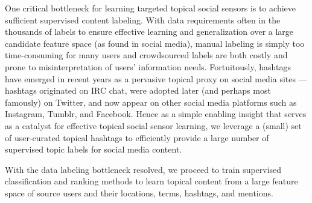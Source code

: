 

One critical bottleneck for learning targeted topical social sensors
is to achieve sufficient supervised content labeling.  With data
requirements often in the thousands of labels to ensure effective
learning and generalization over a large candidate feature space (as
found in social media), manual labeling is simply too time-consuming
for many users and crowdsourced labels are both costly and prone to
misinterpretation of users' information needs.  Fortuitously, hashtags
have emerged in recent years as a pervasive topical proxy on social
media sites --- hashtags originated on IRC chat, were adopted later
(and perhaps most famously) on Twitter, and now appear on other social
media platforms such as Instagram, Tumblr, and Facebook.  Hence as a
simple enabling insight that serves as a catalyst for effective
topical social sensor learning, we leverage a (small) set of
user-curated topical hashtags to efficiently provide a large number of
supervised topic labels for social media content.

With the data labeling bottleneck resolved, we proceed to train
supervised classification and ranking methods to learn topical content
from a large feature space of source users and their locations, terms,
hashtags, and mentions.



